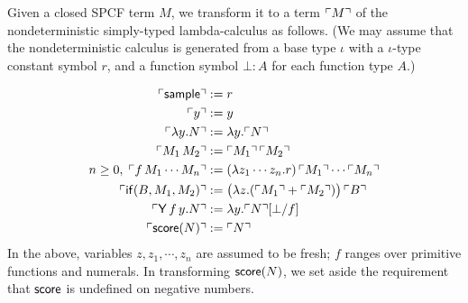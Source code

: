 Given a closed SPCF term $M$, we transform it to a term ${\ulcorner{M}\urcorner}$ of the nondeterministic simply-typed lambda-calculus as follows.
(We may assume that the nondeterministic calculus is generated from a base type $\iota$ with a $\iota$-type constant symbol $r$, and a function symbol $\bot : A$  for each function type $A$.)
\iffalse
\begin{enumerate}
\item replace every $\tsample$ by $r$ 

\item replace each base-type subterm $f \, M_1 \cdots M_n$ by $(\lambda x_1 \cdots x_n . r) \, \transform{M_1} \cdots \transform{M_n}$ where $f$ is a primitive function

\item replace every subterm $\tif{B}{M_1}{M_2}$ by
$(\lambda x . \transform{M_1} + \transform{M_2}) \, \transform{B}$, for a fresh $x$

\item replace every $\tY \, f \, x . N$ by $\lambda x . \transform{N}[\bot / f]$

\item replace every $\tscore (N)$ by $\transform{N}$ (we set aside the requirement that $\tscore$ is undefined on negative numbers)
\end{enumerate}
\lo{The above rules can be defined formally.}
\fi
\begin{align*}
{\ulcorner{\mathsf{sample}}\urcorner} &:= r\\
{\ulcorner{y}\urcorner} &:= y \\
{\ulcorner{\lambda y . N}\urcorner} &:= \lambda y . {\ulcorner{N}\urcorner}\\
{\ulcorner{M_1 \, M_2}\urcorner} &:= {\ulcorner{M_1}\urcorner} \, {\ulcorner{M_2}\urcorner} \\
n \geq 0, \; {\ulcorner{f \, M_1 \cdots M_n}\urcorner} &:= (\lambda z_1 \cdots z_n . r) \, {\ulcorner{M_1}\urcorner} \cdots {\ulcorner{M_n}\urcorner} \\
{\ulcorner{\mathsf{if}(B, M_1, M_2)}\urcorner} &:= \big(\lambda z . ({\ulcorner{M_1}\urcorner} + {\ulcorner{M_2}\urcorner})\big) \, {\ulcorner{B}\urcorner} \\
{\ulcorner{\mathsf{Y}\, f \, y . N}\urcorner} &:= \lambda y . {\ulcorner{N}\urcorner}[\bot / f]\\
{\ulcorner{\mathsf{score}(N)}\urcorner} &:= {\ulcorner{N}\urcorner}
\end{align*}
In the above, variables $z, z_1, \cdots, z_n$ are assumed to be fresh; $f$ ranges over primitive functions and numerals.
In transforming $\tscore (N)$, we set aside the requirement that $\tscore$ is undefined on negative numbers.

